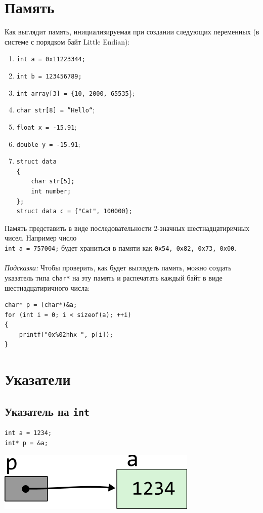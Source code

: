 \documentclass{article}
\begin{document}
\section*{Память}
Как выглядит память, инициализируемая при создании следующих переменных (в системе с порядком байт Little Endian):
\begin{multicols}{2}
\begin{enumerate}
\item \texttt{int a = 0x11223344;}
\item \texttt{int b = 123456789;}
\item \texttt{int array[3] = \{10, 2000, 65535}\};
\item \texttt{char str[8] = ''Hello``};
\item \texttt{float x = -15.91};
\item \texttt{double y = -15.91};
\item
\begin{verbatim}
struct data
{
    char str[5];
    int number;
};
struct data c = {"Cat", 100000};
\end{verbatim}
\end{enumerate}
\end{multicols}
Память представить в виде последовательности 2-значных шестнадцатиричных чисел. Например число \\
\texttt{int a = 757004;} будет храниться в памяти как \texttt{0x54, 0x82, 0x73, 0x00}. \\ \\
\textit{Подсказка:} Чтобы проверить, как будет выглядеть память, можно создать указатель типа \texttt{char*} на эту память и распечатать каждый байт в виде шестнадцатиричного числа:
\begin{lstlisting}
char* p = (char*)&a;
for (int i = 0; i < sizeof(a); ++i)
{
    printf("0x%02hhx ", p[i]);
}
\end{lstlisting}

\section*{Указатели}

\subsection*{Указатель на \texttt{int}}
\begin{lstlisting}
int a = 1234;
int* p = &a;
\end{lstlisting}
\begin{center}
\includegraphics[scale=1]{../../images/pointer_schemes/pointer_to_int.png}
\end{center}
\end{document}
